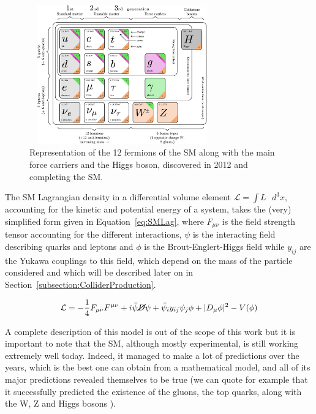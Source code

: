\documentclass[a4paper, 10pt, openright]{report}
\begin{document}
\begin{figure}[htbp]
\begin{center}
\includegraphics[width=8cm, height=6cm]{figs/SMFermions.png}
\caption{Representation of the 12 fermions of the \ac{SM} \cite{SMFermions} along with the main force carriers and the Higgs boson, discovered in 2012 and completing the \ac{SM}.}
\label{figure:SMFermions}
\end{center}
\end{figure}

The \ac{SM} Lagrangian density in a differential volume element $\mathcal{L} = \int L \text{ } d^3x$, accounting for the kinetic and potential energy of a system, takes the (very) simplified form given in Equation~\ref{eq:SMLag}, where $F_{\mu \nu}$ is the field strength tensor accounting for the different interactions, $\psi$ is the interacting field describing quarks and leptons and $\phi$ is the Brout-Englert-Higgs field while $y_{ij}$ are the Yukawa couplings to this field, which depend on the mass of the particle considered and which will be described later on in Section~\ref{subsection:ColliderProduction}.

\begin{equation}
\mathcal{L} = - \frac{1}{4} F_{\mu \nu} F^{\mu \nu} + i \bar{\psi} \cancel{D} \psi + \bar{\psi}_i y_{ij} \psi_j \phi + |D_\mu \phi|^2 - V(\phi)
\label{eq:SMLag}
\end{equation}

A complete description of this model is out of the scope of this work but it is important to note that the \ac{SM}, although mostly experimental, is still working extremely well today. Indeed, it managed to make a lot of predictions over the years, which is the best one can obtain from a mathematical model, and all of its major predictions revealed themselves to be true (we can quote for example that it successfully predicted the existence of the gluons, the top quarks, along with the W, Z and Higgs bosons \cite{SMPredictions}).
\end{document}
